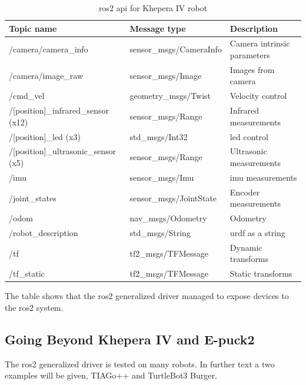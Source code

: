 \begin{table}[H]
    \begin{adjustwidth}{-1.5in}{-1.5in}
    \centering
    \begin{tabular}{|l|l|l|}
        \hline
        \textbf{Topic name} & \textbf{Message type} & \textbf{Description} \\
        \hline
        /camera/camera\_info & sensor\_msgs/CameraInfo & Camera intrinsic parameters \\
        \hline
        /camera/image\_raw & sensor\_msgs/Image & Images from camera \\
        \hline
        /cmd\_vel & geometry\_msgs/Twist & Velocity control \\
        \hline
        /[position]\_infrared\_sensor (x12) & sensor\_msgs/Range & Infrared measurements \\
        \hline
        /[position]\_led (x3) & std\_msgs/Int32 & \ac{led} control \\
        \hline
        /[position]\_ultrasonic\_sensor (x5) & sensor\_msgs/Range & Ultrasonic measurements \\
        \hline
        /imu & sensor\_msgs/Imu & \ac{imu} measurements \\
        \hline
        /joint\_states & sensor\_msgs/JointState & Encoder measurements \\
        \hline
        /odom & nav\_msgs/Odometry & Odometry \\
        \hline
        /robot\_description & std\_msgs/String & \ac{urdf} as a string \\
        \hline
        /tf & tf2\_msgs/TFMessage & Dynamic transforms \\
        \hline
        /tf\_static & tf2\_msgs/TFMessage & Static transforms \\
        \hline
    \end{tabular}
    \caption{\ac{ros2} \ac{api} for Khepera IV robot}
    \label{tab:result:khepera4_api}
    \end{adjustwidth}
\end{table}

The table shows that the \ac{ros2} generalized driver managed to expose devices to the \ac{ros2} system.

\subsection{Going Beyond Khepera IV and E-puck2}

The \ac{ros2} generalized driver is tested on many robots.
In further text a two examples will be given, TIAGo++ and TurtleBot3 Burger.


